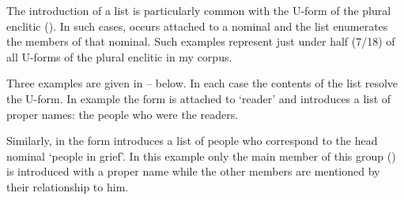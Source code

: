 The introduction of a list is particularly common with
the U-form of the plural enclitic  ().
In such cases,  occurs attached to a nominal
and the list enumerates the members of that nominal.
Such examples represent just under half (7/18) of all U-forms
of the plural enclitic  in my corpus.

Three examples are given in -- below.
In each case the contents of the list resolve the U-form.
In example  the form  is attached to 
`reader' and introduces a list of proper names:
the people who were the readers.

\begin{exe}
	\label{ex:130920-1, 1.32-1.36}
	\begin{xlist}
	\end{xlist}
\end{exe}

Similarly, in  the form 
introduces a list of people who correspond to the head nominal
 `people in grief'.
In this example only the main member of this group ()
is introduced with a proper name while the other members
are mentioned by their relationship to him.

